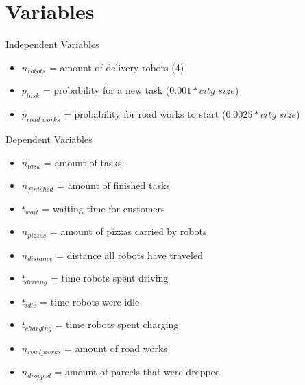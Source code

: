 \section{Variables}

\begin{frame}{Independent Variables} %
    \begin{itemize}
        \item $n_{robots}$ = amount of delivery robots {\tiny($4$)}
        \item $p_{task}$ = probability for a new task {\tiny($0.001*city\_size$)}
        \item $p_{road\_works}$ = probability for road works to start {\tiny($0.0025 * city\_size$)}
    \end{itemize}
\end{frame}

\begin{frame}{Dependent Variables} %
    \begin{itemize}
        \item $n_{task}$ = amount of tasks                        %
        \item $n_{finished}$ = amount of finished tasks           %
        \item $t_{wait}$ = waiting time for customers             %
        \item $n_{pizzas}$ = amount of pizzas carried by robots   %
        \item $n_{distance}$ = distance all robots have traveled  %
        \item $t_{driving}$ = time robots spent driving           %
        \item $t_{idle}$ = time robots were idle                  %
        \item $t_{charging}$ = time robots spent charging         %
        \item $n_{road\_works}$ = amount of road works            %
        \item $n_{dropped}$ = amount of parcels that were dropped %
    \end{itemize}
\end{frame}

